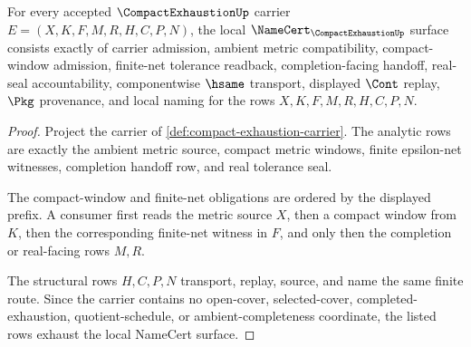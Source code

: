 \begin{theorem}
\label{thm:compact-exhaustion-namecert-obligations}
For every accepted $\CompactExhaustionUp$ carrier $E=(X,K,F,M,R,H,C,P,N)$, the local $\NameCert_{\CompactExhaustionUp}$ surface consists exactly of carrier admission, ambient metric compatibility, compact-window admission, finite-net tolerance readback, completion-facing handoff, real-seal accountability, componentwise $\hsame$ transport, displayed $\Cont$ replay, $\Pkg$ provenance, and local naming for the rows $X,K,F,M,R,H,C,P,N$.
\end{theorem}
\begin{proof}
Project the carrier of \autoref{def:compact-exhaustion-carrier}. The analytic rows are exactly the ambient metric source, compact metric windows, finite epsilon-net witnesses, completion handoff row, and real tolerance seal.

The compact-window and finite-net obligations are ordered by the displayed prefix. A consumer first reads the metric source $X$, then a compact window from $K$, then the corresponding finite-net witness in $F$, and only then the completion or real-facing rows $M,R$.

The structural rows $H,C,P,N$ transport, replay, source, and name the same finite route. Since the carrier contains no open-cover, selected-cover, completed-exhaustion, quotient-schedule, or ambient-completeness coordinate, the listed rows exhaust the local NameCert surface.
\end{proof}

